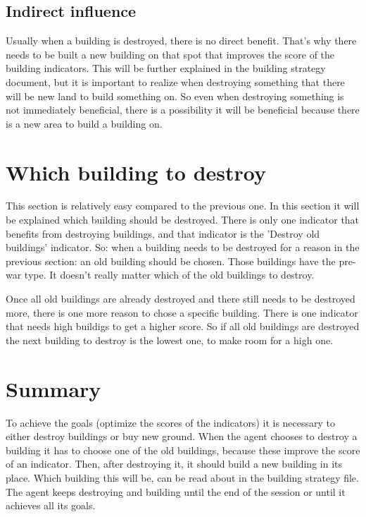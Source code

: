 \documentclass{article}
\begin{document}
\subsection{Indirect influence}
Usually when a building is destroyed, there is no direct benefit. That's why there needs to be built a new building on that spot that improves the score of the building indicators. This will be further explained in the building strategy document, but it is important to realize when destroying something that there will be new land to build something on. So even when destroying something is not immediately beneficial, there is a possibility it will be beneficial because there is a new area to build a building on.

\section{Which building to destroy}
This section is relatively easy compared to the previous one. In this section it will be explained which building should be destroyed. There is only one indicator that benefits from destroying buildings, and that indicator is the 'Destroy old buildings' indicator. So: when a building needs to be destroyed for a reason in the previous section: an old building should be chosen. Those buildings have the pre-war type. It doesn't really matter which of the old buildings to destroy. 

Once all old buildings are already destroyed and there still needs to be destroyed more, there is one more reason to chose a specific building. There is one indicator that needs high buildigs to get a higher score. So if all old buildings are destroyed the next building to destroy is the lowest one, to make room for a high one.

\section{Summary}
To achieve the goals (optimize the scores of the indicators) it is necessary to either destroy buildings or buy new ground. When the agent chooses to destroy a building it has to choose one of the old buildings, because these improve the score of an indicator. Then, after destroying it, it should build a new building in its place. Which building this will be, can be read about in the building strategy file. The agent keeps destroying and building until the end of the session or until it achieves all its goals. 
\end{document}
